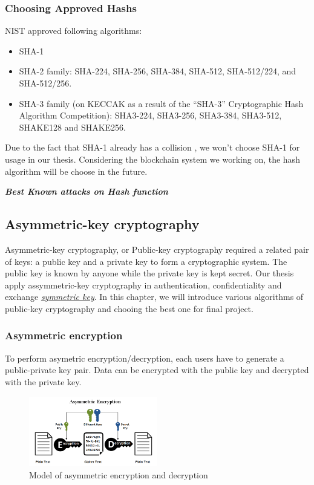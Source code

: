 \subsubsection{Choosing Approved Hashs}
NIST approved following algorithms:
\begin{itemize}
  \item SHA-1 \cite{DBLP:journals/cryptologia/Dang13}

  \item SHA-2 family: SHA-224, SHA-256, SHA-384, SHA-512, SHA-512/224, and SHA-512/256. \cite{DBLP:journals/cryptologia/Dang13}

  \item SHA-3 family (on KECCAK \cite{DBLP:journals/iacr/BertoniDPA15} as a result of the “SHA-3” Cryptographic Hash Algorithm Competition):  SHA3-224, SHA3-256, SHA3-384, SHA3-512, SHAKE128 and SHAKE256.
\end{itemize}
Due to the fact that SHA-1 already has a collision \cite{SHA-1:Collision}, we won't choose SHA-1 for usage in our thesis.
Considering the blockchain system we working on, the hash algorithm will be choose in the future.

\bigskip
{\textit {\textbf{Best Known attacks on Hash function}}}

\subsection{Asymmetric-key cryptography}
\label{sec:asymmetric_cryptography}
Asymmetric-key cryptography, or Public-key cryptography required a related pair of keys: a public key and a private key to form a cryptographic system.
The public key is known by anyone while the private key is kept secret. Our thesis apply assymmetric-key cryptography in authentication, confidentiality and exchange \emph{\hyperref[sec: Symmetric_keys]{symmetric key}}.
In this chapter, we will introduce various algorithms of public-key cryptography and chooing the best one for final project.

\subsubsection{Asymmetric encryption}
To perform asymetric encryption/decryption, each users have to generate a public-private key pair.
Data can be encrypted with the public key and decrypted with the private key.

\begin{figure}[ht!]
  \centering
  \includegraphics[width=0.5\textwidth]{images/asymmetric_encrypt.png}
  \caption[Model of asymmetric encryption and decryption]{Model of asymmetric encryption and decryption}
  \label{fig:asymmetric_encrypt}
\end{figure}

